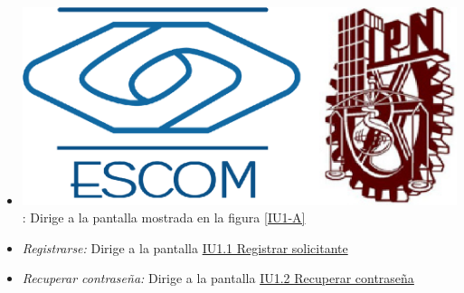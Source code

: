 		\begin{itemize}

			\item \includegraphics[scale=0.03]{imagenes/iconografia/aceptar.jpg}: Dirige a la pantalla mostrada en  la figura \ref{IU1-A}
			\item \textit{Registrarse:} Dirige a la pantalla \hyperlink{IU1.1}{IU1.1 Registrar solicitante}
			\item \textit{Recuperar contraseña:} Dirige a la pantalla \hyperlink{IU1.2}{IU1.2 Recuperar contraseña}

		\end{itemize}


